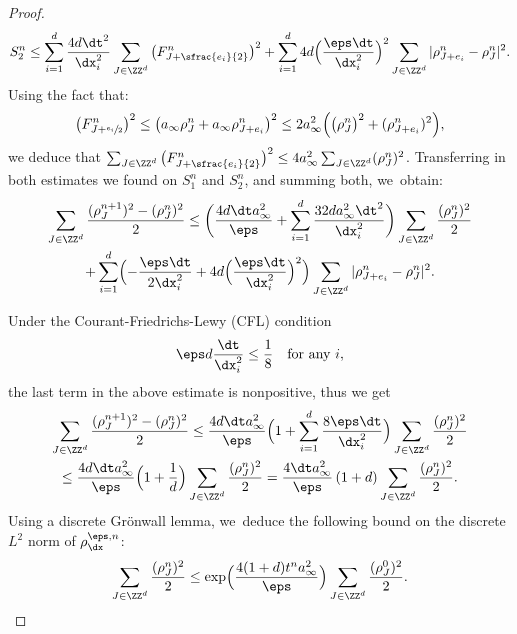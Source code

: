 \begin{proof}
\[
S_2^n \leq \sum_{i=1}^{d} \frac{4 d \dt^2}{\dx_i^2} \sum_{J \in \ZZ^d} \big(F_{J+ \sfrac{e_i}{2}}^n\big)^2 + \sum_{i=1}^{d} 4 d \Bigl(\frac{\eps\dt}{\dx_i^2}\Bigr)^2 \sum_{J \in \ZZ^d} |\rho_{J+e_i}^n - \rho_J^n|^2.
\]
Using the fact that:
\[
\big(F_{J+ \sfrac{e_i}{2}}^n\big)^2 \leq \big(a_\infty \rho_J^n + a_\infty \rho_{J+e_i}^n\big)^2 \leq 2a_\infty^2 \Big(\big(\rho_J^n\big)^2 +(\rho_{J+e_i}^n)^2\Big),
\]
we deduce that $\sum_{J \in \ZZ^d} \big(F_{J+ \sfrac{e_i}{2}}^n\big)^2 \leq 4a_\infty^2 \sum_{J\in\ZZ^d}(\rho_J^n)^2$. Transferring in both estimates we found on $S_1^n$ and $S_2^n$, and summing both, we~obtain:
\begin{multline}\label{eq:disH1estimate:1}
\sum_{J \in \ZZ^d} \frac{(\rho_J^{n+1})^2 -(\rho_J^n)^2}{2}\leq \biggl(\frac{4d\dt a_\infty^2}{\eps} + \sum_{i=1}^{d} \frac{32 d a_\infty^2\dt^2}{\dx_i^2}\biggr) \sum_{J\in\ZZ^d} \frac{(\rho_J^n)^2}{2} \\
+ \sum_{i=1}^{d} \Bigl(-\frac{\eps\dt}{2\dx_i^2} + 4 d \Bigl(\frac{\eps\dt}{\dx_i^2}\Bigr)^2\Bigr) \sum_{J \in \ZZ^d} |\rho_{J+e_i}^n - \rho_J^n|^2.
\end{multline}

Under the Courant-Friedrichs-Lewy (CFL) condition
\begin{equation*}
\eps d \frac{\dt}{\dx_i^2} \leq \frac 18 \quad \text{for any } i,
\end{equation*}
the last term in the above estimate is nonpositive, thus we get
\begin{multline*}
\sum_{J \in \ZZ^d} \frac{(\rho_J^{n+1})^2 -(\rho_J^n)^2}{2} \leq \frac{4d\dt a_\infty^2}{\eps}\Bigl(1 + \sum_{i=1}^{d} \frac{8\eps\dt}{\dx_i^2}\Bigr) \sum_{J\in\ZZ^d} \frac{(\rho_J^n)^2}{2} \\
\leq \frac{4d\dt a_\infty^2}{\eps}\Bigl(1 + \frac{1}{d}\Bigr) \sum_{J\in\ZZ^d} \frac{(\rho_J^n)^2}{2} = \frac{4\dt a_\infty^2}{\eps}\left(1 + d\right) \sum_{J\in\ZZ^d} \frac{(\rho_J^n)^2}{2}.
\end{multline*}
Using a discrete Grönwall lemma, we~deduce the following bound on the discrete $L^2$ norm of $\rho_{\dx}^{\eps,n}$:
\[
\sum_{J \in \ZZ^d} \frac{(\rho_J^n)^2}{2} \leq \exp\Bigl(\frac{4(1 + d)t^n a_\infty^2}{\eps}\Bigr) \sum_{J \in \ZZ^d} \frac{(\rho_J^0)^2}{2}.
\]


\end{proof}
